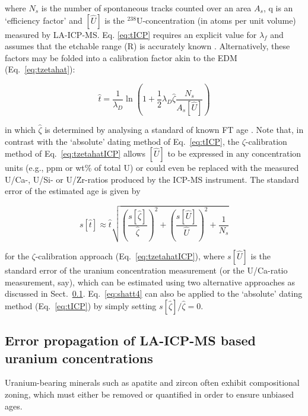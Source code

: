 \documentclass{article}
\begin{document}
where $N_s$ is the number of spontaneous tracks counted over an area
$A_s$, q is an `efficiency factor' \citep[$\sim$0.93 for apatite and
  $\sim$1 for
  zircon,][]{iwano1998,enkelmann2003,jonckheere2003b,soares2013} and
$[\hat{U}]$ is the $^{238}$U-concentration (in atoms per unit volume)
measured by LA-ICP-MS. Eq. \ref{eq:tICP} requires an explicit value
for $\lambda_f$ and assumes that the etchable range (R) is accurately
known \citep{soares2014}. Alternatively, these factors may be folded
into a calibration factor akin to the EDM (Eq.~\ref{eq:tzetahat}):

\begin{equation}
\hat{t} = \frac{1}{\lambda_D}
\ln \left(1+\frac{1}{2}\lambda_D\hat{\zeta}\frac{N_s}{A_s[\hat{U}]}\right)
\label{eq:tzetahatICP}
\end{equation}

in which $\hat{\zeta}$ is determined by analysing a standard of known
FT age \citep{hasebe2004}. Note that, in contrast with the `absolute'
dating method of Eq.~\ref{eq:tICP}, the $\zeta$-calibration method of
Eq.~\ref{eq:tzetahatICP} allows $[\hat{U}]$ to be expressed in any
concentration units (e.g., ppm or wt\% of total U) or could even be
replaced with the measured U/Ca-, U/Si- or U/Zr-ratios produced by the
ICP-MS instrument. The standard error of the estimated age is given by

\begin{equation}
s[\hat{t}] \approx \hat{t} \sqrt{ 
  \left(\frac{s[\hat{\zeta}]}{\hat{\zeta}}\right)^2 +
  \left(\frac{s[\hat{U}]}{\hat{U}}\right)^2 +
  \frac{1}{N_s}
}
\label{eq:shatt4}
\end{equation}

for the $\zeta$-calibration approach (Eq.~\ref{eq:tzetahatICP}), where
$s[\hat{U}]$ is the standard error of the uranium concentration
measurement (or the U/Ca-ratio measurement, say), which can be
estimated using two alternative approaches as discussed in
Sect.~\ref{sec:uICPerr}. Eq.~\ref{eq:shatt4} can also be applied to
the `absolute' dating method (Eq.~\ref{eq:tICP}) by simply setting
$s[\hat{\zeta}]/\hat{\zeta}=0$.

\subsection{Error propagation of LA-ICP-MS based uranium concentrations}
\label{sec:uICPerr}

Uranium-bearing minerals such as apatite and zircon often exhibit
compositional zoning, which must either be removed or quantified in
order to ensure unbiased ages.
\end{document}
